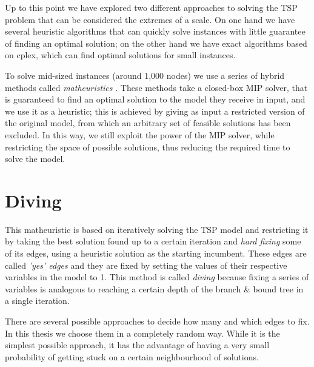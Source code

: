 Up to this point we have explored two different approaches to solving the TSP problem that can be considered the extremes of a scale. On one hand we have several heuristic algorithms that can quickly solve instances with little guarantee of finding an optimal solution; on the other hand we have exact algorithms based on cplex, which can find optimal solutions for small instances.

To solve mid-sized instances (around 1,000 nodes) we use a series of hybrid methods called \textit{matheuristics} \cite{Fischetti2016}. These methods take a closed-box MIP solver, that is guaranteed to find an optimal solution to the model they receive in input, and we use it as a heuristic; this is achieved by giving as input a restricted version of the original model, from which an arbitrary set of feasible solutions has been excluded. In this way, we still exploit the power of the MIP solver, while restricting the space of possible solutions, thus reducing the required time to solve the model.

\section{Diving}

This matheuristic is based on iteratively solving the TSP model and restricting it by taking the best solution found up to a certain iteration and \textit{hard fixing} some of its edges, using a heuristic solution as the starting incumbent. These edges are called \textit{'yes' edges} and they are fixed by setting the values of their respective variables in the model to 1. This method is called \textit{diving} because fixing a series of variables is analogous to reaching a certain depth of the branch \& bound tree in a single iteration.

There are several possible approaches to decide how many and which edges to fix. In this thesis we choose them in a completely random way. While it is the simplest possible approach, it has the advantage of having a very small probability of getting stuck on a certain neighbourhood of solutions.

\newpage

